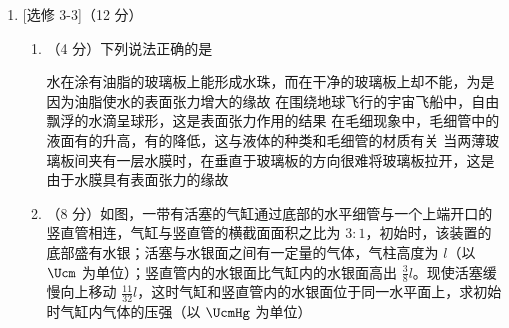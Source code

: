 \documentclass[\gkver]{gaokaozhenti}
\begin{document}
\begin{enumerate}
{$v=\frac{qBR}{m}$ ②

设点电荷 $a$ 做圆周运动的周期为 $T$，有

$T=\frac{2\pi m}{qB}$ ③

如图，$O$ 和 $O_1$ 分别是 $a$ 和 $b$ 的圆轨道的圆心。设 $a$ 在磁场中偏转的角度为 $\theta$，由几何关系得：

$\theta=90^\circ$ ④

故 $a$ 从开始运动到经过 $G$ 点所用时间 $t$ 为

$t=\frac{\pi m}{2qB}$ ⑤

（2）设点电荷 $b$ 的速度大小为 $v_1$，轨道半径为 $R_1$，$b$ 在磁场中偏转的角度为 $\theta_1$，依题意有

$t=\frac{R_1\theta_1}{v_1}=\frac{R\theta}{v}$ ⑥

由⑥式得

$v_1=\frac{R_1\theta_1}{R\theta}v$ ⑦

由于两轨道在 $G$ 点相切，所有过 $G$ 点的半径 $OG$ 和 $O_1G$ 在同一直线上，由几何关系和题给条件得

$\theta_1=60^\circ$ ⑧

$R_1=2R$ ⑨

联立②④⑦⑧⑨式，解得

$v_1=\frac{4qBR}{3m}$ ⑩
}

\item
[选修 3-3]（12 分）

\begin{enumerate}
	\item
	（4 分）下列说法正确的是

	{水在涂有油脂的玻璃板上能形成水珠，而在干净的玻璃板上却不能，为是因为油脂使水的表面张力增大的缘故}
	{在围绕地球飞行的宇宙飞船中，自由飘浮的水滴呈球形，这是表面张力作用的结果}
	{在毛细现象中，毛细管中的液面有的升高，有的降低，这与液体的种类和毛细管的材质有关}
	{当两薄玻璃板间夹有一层水膜时，在垂直于玻璃板的方向很难将玻璃板拉开，这是由于水膜具有表面张力的缘故}

	\item
	（8 分）如图，一带有活塞的气缸通过底部的水平细管与一个上端开口的竖直管相连，气缸与竖直管的横截面面积之比为 $3:1$，初始时，该装置的底部盛有水银；活塞与水银面之间有一定量的气体，气柱高度为 $l$（以 $\Ucm$ 为单位）；竖直管内的水银面比气缸内的水银面高出 $\frac{3}{8}l$。现使活塞缓慢向上移动 $\frac{11}{32}l$，这时气缸和竖直管内的水银面位于同一水平面上，求初始时气缸内气体的压强（以 $\UcmHg$ 为单位）


\end{enumerate}
\end{enumerate}
\end{document}
